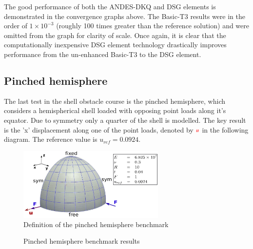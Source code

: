  The good performance of both the ANDES-DKQ and DSG elements is demonstrated in the convergence graphs above. The Basic-T3 results were in the order of $1\times10^{-3}$ (roughly 100 times greater than the reference solution) and were omitted from the graph for clarity of scale. Once again, it is clear that the computationally inexpensive DSG element technology drastically improves performance from the un-enhanced Basic-T3 to the DSG element.
\newpage
\subsection{Pinched hemisphere}
%

The last test in the shell obstacle course is the pinched hemisphere, which considers a hemispherical shell loaded with opposing point loads along it's equator. Due to symmetry only a quarter of the shell is modelled. The key result is the 'x' displacement along one of the point loads, denoted by $\textcolor{red}{u}$ in the following diagram. The reference value is $u_{ref} =  0.0924$. 

\begin{figure}[H]
	\centering
	\def\svgwidth{\columnwidth}
	\includegraphics[width=7.3cm]{images/pinchedhemisphere.png}
	\caption{Definition of the pinched hemisphere benchmark \cite{Bou13}}
\end{figure}

\begin{figure}[H]
	\caption{\label{ref_label_overall}Pinched hemisphere benchmark results}
\end{figure}

